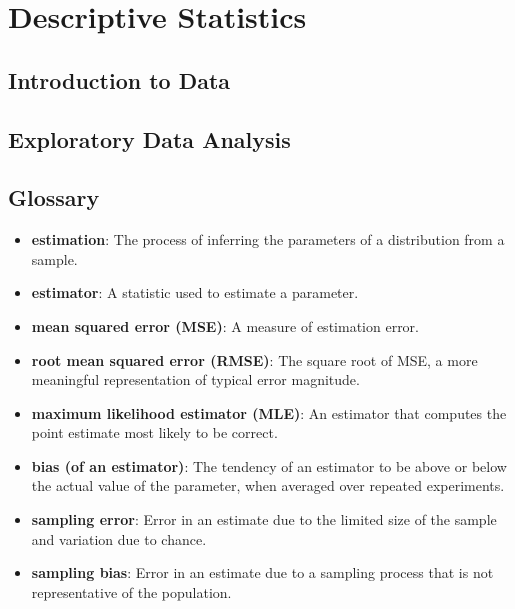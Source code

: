 

 \chapter{Descriptive Statistics } \section{Introduction to Data}
 \section{Exploratory Data Analysis} \section*{Glossary} \begin{itemize}
	
	\item {\bf estimation}: The process of inferring the parameters of a distribution
	from a sample.
	
	\item {\bf estimator}: A statistic used to estimate a parameter.
	
	\item {\bf mean squared error (MSE)}: A measure of estimation error.
	
	\item {\bf root mean squared error (RMSE)}: The square root of MSE,
	a more meaningful representation of typical error magnitude.
	
	\item {\bf maximum likelihood estimator (MLE)}: An estimator that computes the
	point estimate most likely to be correct.
	
	\item {\bf bias (of an estimator)}: The tendency of an estimator to be above or
	below the actual value of the parameter, when averaged over repeated
	experiments.  
	
	\item {\bf sampling error}: Error in an estimate due to the limited
	size of the sample and variation due to chance. 
	
	\item {\bf sampling bias}: Error in an estimate due to a sampling process
	that is not representative of the population. 
	

\end{itemize}
